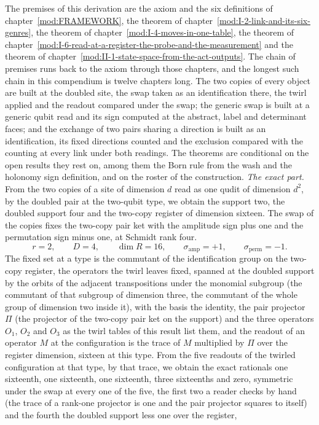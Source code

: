 \begin{chproof}
The premises of this derivation are the axiom and the six definitions of chapter~\ref{mod:FRAMEWORK}, the theorem of chapter~\ref{mod:I-2-link-and-its-six-genres}, the theorem of chapter~\ref{mod:I-4-moves-in-one-table}, the theorem of chapter~\ref{mod:I-6-read-at-a-register-the-probe-and-the-measurement} and the theorem of chapter~\ref{mod:II-1-state-space-from-the-act-outputs}. The chain of premises runs back to the axiom through those chapters, and the longest such chain in this compendium is twelve chapters long.
The two copies of every object are built at the doubled site, the swap taken as an identification there, the twirl applied and the readout compared under the swap; the generic swap is built at a generic qubit read and its sign computed at the abstract, label and determinant faces; and the exchange of two pairs sharing a direction is built as an identification, its fixed directions counted and the exclusion compared with the counting at every link under both readings. The theorems are conditional on the open results they rest on, among them the Born rule from the wash and the holonomy sign definition, and on the roster of the construction.
\textit{The exact part.}
From the two copies of a site of dimension $d$ read as one qudit of dimension $d^{2}$, by the doubled pair at the two-qubit type, we obtain the support two, the doubled support four and the two-copy register of dimension sixteen. The swap of the copies fixes the two-copy pair ket with the amplitude sign plus one and the permutation sign minus one, at Schmidt rank four.
\begin{equation}
r = 2, \qquad D = 4, \qquad \dim R = 16, \qquad \sigma_{\mathrm{amp}} = +1, \qquad \sigma_{\mathrm{perm}} = -1 .
\end{equation}
The fixed set at a type is the commutant of the identification group on the two-copy register, the operators the twirl leaves fixed, spanned at the doubled support by the orbits of the adjacent transpositions under the monomial subgroup (the commutant of that subgroup of dimension three, the commutant of the whole group of dimension two inside it), with the basis the identity, the pair projector $\Pi$ (the projector of the two-copy pair ket on the support) and the three operators $O_{1}$, $O_{2}$ and $O_{3}$ as the twirl tables of this result list them, and the readout of an operator $M$ at the configuration is the trace of $M$ multiplied by $\Pi$ over the register dimension, sixteen at this type. From the five readouts of the twirled configuration at that type, by that trace, we obtain the exact rationals one sixteenth, one sixteenth, one sixteenth, three sixteenths and zero, symmetric under the swap at every one of the five, the first two a reader checks by hand (the trace of a rank-one projector is one and the pair projector squares to itself) and the fourth the doubled support less one over the register,

\end{chproof}
